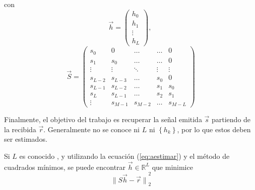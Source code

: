 \documentclass[a4paper]{article}
\begin{document}
 	 	con
 	 	\[ \vec{h} =  
 	 		\left( \begin{array}{l}
				h_{0}              \\
				h_{1}              \\
				\vdots 				\\
				h_{L}             
			\end{array} \right)
		,\
		\]
 	 	\[ \vec{S} =
 	 		\left( \begin{array}{lllll}
				s_{0}   & 0       & \hdots      & \hdots	& 0	\\
				s_{1}   & s_{0}   & \hdots      & \hdots	& 0	\\
				\vdots  & \vdots  & \ddots      & \vdots	& \vdots	\\
				s_{L-2} & s_{L-3} & \hdots      & s_{0}	& 0	\\
				s_{L-1} & s_{L-2} & \hdots      & s_{1}	& s_{0}	\\
				s_{L}   & s_{L-1} & \hdots      & s_{2}	& s_{1}	\\
				\vdots	& s_{M-1} & s_{M-2}		& \hdots	& s_{M-L}
			\end{array} \right)
		\]	\par
		
		Finalmente, el objetivo del trabajo es recuperar la señal emitida $ \vec{s} $ partiendo de la recibida  $ \vec{r} $. Generalmente no se conoce ni $ L $ ni $ {\left \lbrace h_k \right \rbrace} $, por lo que estos deben ser estimados.\par
		Si $ L $ es conocido%
		, y utilizando la ecuación (\ref{eq:aestimar}) y el método de cuadrados mínimos, se puede encontrar $ \vec{h} \in \mathbb{R}^L $ que minimice
		\begin{equation}
			{\| S\vec{h} - \vec{r} \|}_{2}^{2}
			\label{eq:svd}		
		\end{equation}
		
\end{document}

